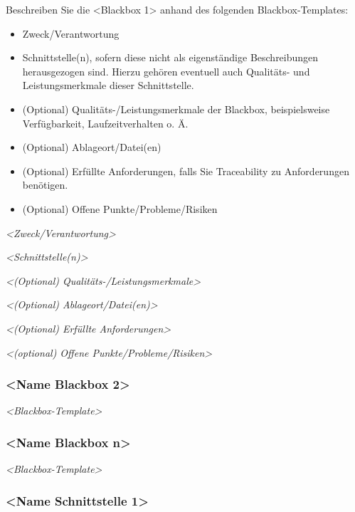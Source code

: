 \documentclass[]{article}
\begin{document}
Beschreiben Sie die \textless{}Blackbox 1\textgreater{} anhand des
folgenden Blackbox-Templates:

\begin{itemize}
\item
  Zweck/Verantwortung
\item
  Schnittstelle(n), sofern diese nicht als eigenständige Beschreibungen
  herausgezogen sind. Hierzu gehören eventuell auch Qualitäts- und
  Leistungsmerkmale dieser Schnittstelle.
\item
  (Optional) Qualitäts-/Leistungsmerkmale der Blackbox, beispielsweise
  Verfügbarkeit, Laufzeitverhalten o. Ä.
\item
  (Optional) Ablageort/Datei(en)
\item
  (Optional) Erfüllte Anforderungen, falls Sie Traceability zu
  Anforderungen benötigen.
\item
  (Optional) Offene Punkte/Probleme/Risiken
\end{itemize}

\emph{\textless{}Zweck/Verantwortung\textgreater{}}

\emph{\textless{}Schnittstelle(n)\textgreater{}}

\emph{\textless{}(Optional) Qualitäts-/Leistungsmerkmale\textgreater{}}

\emph{\textless{}(Optional) Ablageort/Datei(en)\textgreater{}}

\emph{\textless{}(Optional) Erfüllte Anforderungen\textgreater{}}

\emph{\textless{}(optional) Offene
Punkte/Probleme/Risiken\textgreater{}}

\hypertarget{__name_blackbox_2}{%
\subsubsection{\textless{}Name Blackbox
2\textgreater{}}\label{__name_blackbox_2}}

\emph{\textless{}Blackbox-Template\textgreater{}}

\hypertarget{__name_blackbox_n}{%
\subsubsection{\textless{}Name Blackbox
n\textgreater{}}\label{__name_blackbox_n}}

\emph{\textless{}Blackbox-Template\textgreater{}}

\hypertarget{__name_schnittstelle_1}{%
\subsubsection{\textless{}Name Schnittstelle
1\textgreater{}}\label{__name_schnittstelle_1}}
\end{document}
